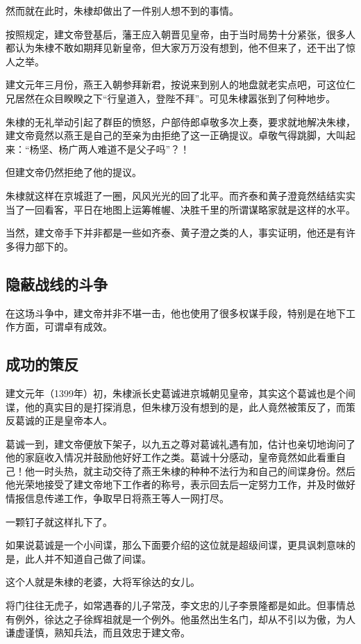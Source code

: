 \begin{multicols}{\theparacolNo}
		然而就在此时，朱棣却做出了一件别人想不到的事情。

		按照规定，建文帝登基后，藩王应入朝晋见皇帝，由于当时局势十分紧张，很多人都认为朱棣不敢如期拜见新皇帝，但大家万万没有想到，他不但来了，还干出了惊人之举。

		建文元年三月份，燕王入朝参拜新君，按说来到别人的地盘就老实点吧，可这位仁兄居然在众目睽睽之下“行皇道入，登陛不拜”。可见朱棣嚣张到了何种地步。

		朱棣的无礼举动引起了群臣的愤怒，户部侍郎卓敬多次上奏，要求就地解决朱棣，建文帝竟然以燕王是自己的至亲为由拒绝了这一正确提议。卓敬气得跳脚，大叫起来：“杨坚、杨广两人难道不是父子吗”？！

		但建文帝仍然拒绝了他的提议。

		朱棣就这样在京城逛了一圈，风风光光的回了北平。而齐泰和黄子澄竟然结结实实当了一回看客，平日在地图上运筹帷幄、决胜千里的所谓谋略家就是这样的水平。

		当然，建文帝手下并非都是一些如齐泰、黄子澄之类的人，事实证明，他还是有许多得力部下的。

		\subsection{隐蔽战线的斗争}
		在这场斗争中，建文帝并非不堪一击，他也使用了很多权谋手段，特别是在地下工作方面，可谓卓有成效。

		\subsection{成功的策反}
		建文元年（1399年）初，朱棣派长史葛诚进京城朝见皇帝，其实这个葛诚也是个间谍，他的真实目的是打探消息，但朱棣万没有想到的是，此人竟然被策反了，而策反葛诚的正是皇帝本人。

		葛诚一到，建文帝便放下架子，以九五之尊对葛诚礼遇有加，估计也亲切地询问了他的家庭收入情况并鼓励他好好工作之类。葛诚十分感动，皇帝竟然如此看重自己！他一时头热，就主动交待了燕王朱棣的种种不法行为和自己的间谍身份。然后他光荣地接受了建文帝地下工作者的称号，表示回去后一定努力工作，并及时做好情报信息传递工作，争取早日将燕王等人一网打尽。

		一颗钉子就这样扎下了。

		如果说葛诚是一个小间谍，那么下面要介绍的这位就是超级间谍，更具讽刺意味的是，此人并不知道自己做了间谍。

		这个人就是朱棣的老婆，大将军徐达的女儿。

		将门往往无虎子，如常遇春的儿子常茂，李文忠的儿子李景隆都是如此。但事情总有例外，徐达之子徐辉祖就是一个例外。他虽然出生名门，却从不引以为傲，为人谦虚谨慎，熟知兵法，而且效忠于建文帝。


\end{multicols}
